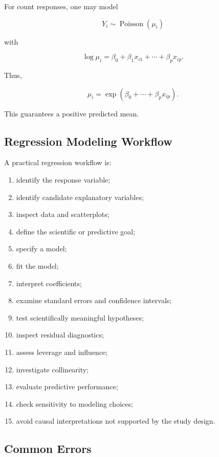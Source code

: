 For count responses, one may model

\[
Y_i
\sim
\operatorname{Poisson}(\mu_i)
\]

with

\[
\boxed{
\log\mu_i
=
\beta_0
+
\beta_1x_{i1}
+
\cdots
+
\beta_px_{ip}.
}
\]

Thus,

\[
\boxed{
\mu_i
=
\exp
(
\beta_0+\cdots+\beta_px_{ip}
).
}
\]

This guarantees a positive predicted mean.

\subsection{Regression Modeling Workflow}
\label{subsec:regression-modeling-workflow}

A practical regression workflow is:

\begin{enumerate}
    \item identify the response variable;
    \item identify candidate explanatory variables;
    \item inspect data and scatterplots;
    \item define the scientific or predictive goal;
    \item specify a model;
    \item fit the model;
    \item interpret coefficients;
    \item examine standard errors and confidence intervals;
    \item test scientifically meaningful hypotheses;
    \item inspect residual diagnostics;
    \item assess leverage and influence;
    \item investigate collinearity;
    \item evaluate predictive performance;
    \item check sensitivity to modeling choices;
    \item avoid causal interpretations not supported by the study design.
\end{enumerate}

\subsection{Common Errors}
\label{subsec:regression-common-errors}

